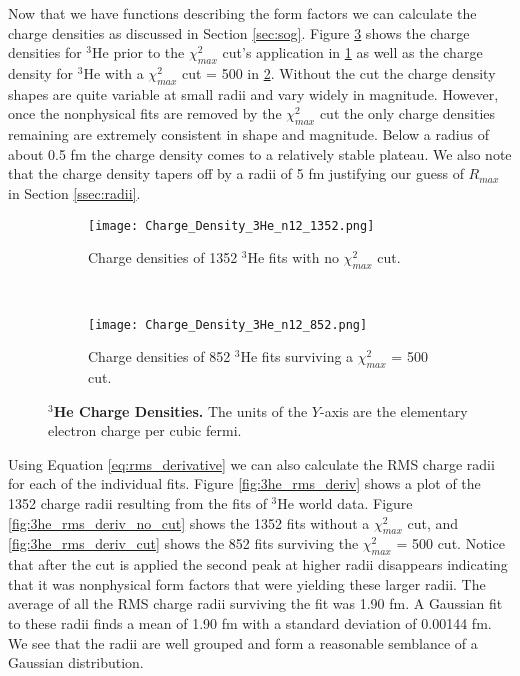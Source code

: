 Now that we have functions describing the form factors we can calculate the charge densities as discussed in Section \ref{sec:sog}. Figure \ref{fig:3he_charge_density} shows the charge densities for $^3$He prior to the $\chi^2_{max}$ cut's application in \ref{fig:3he_charge_density_no_cut} as well as the charge density for $^3$He with a $\chi^2_{max}$ cut = 500 in \ref{fig:3he_charge_density_cut}. Without the cut the charge density shapes are quite variable at small radii and vary widely in magnitude. However, once the nonphysical fits are removed by the $\chi^2_{max}$ cut the only charge densities remaining are extremely consistent in shape and magnitude. Below a radius of about 0.5 fm the charge density comes to a relatively stable plateau. We also note that the charge density tapers off by a radii of 5 fm justifying our guess of $R_{max}$ in Section \ref{ssec:radii}. %

\begin{figure}[!ht]
\begin{subfigure}{1.\textwidth}
  \centering
  \texttt{[image: Charge\_Density\_3He\_n12\_1352.png]}
  \caption{Charge densities of 1352 $^3$He fits with no $\chi^2_{max}$ cut.}
  \label{fig:3he_charge_density_no_cut}
\end{subfigure}\\
\begin{subfigure}{1.\textwidth}
  \centering
  \texttt{[image: Charge\_Density\_3He\_n12\_852.png]}
  \caption{Charge densities of 852 $^3$He fits surviving a $\chi^2_{max}$ = 500 cut.}
  \label{fig:3he_charge_density_cut}
\end{subfigure}
\caption[$^3$He Charge Densities]{{\bf{$^3$He Charge Densities.}} The units of the $Y$-axis are the elementary electron charge per cubic fermi.}
\label{fig:3he_charge_density}
\end{figure}

Using Equation \ref{eq:rms_derivative} we can also calculate the RMS charge radii for each of the individual fits. Figure \ref{fig:3he_rms_deriv} shows a plot of the 1352 charge radii resulting from the fits of $^3$He world data. Figure \ref{fig:3he_rms_deriv_no_cut} shows the 1352 fits without a $\chi^2_{max}$ cut, and \ref{fig:3he_rms_deriv_cut} shows the 852 fits surviving the $\chi^2_{max}$ = 500 cut. Notice that after the cut is applied the second peak at higher radii disappears indicating that it was nonphysical form factors that were yielding these larger radii. The average of all the RMS charge radii surviving the fit was 1.90 fm. A Gaussian fit to these radii finds a mean of 1.90 fm with a standard deviation of 0.00144 fm. We see that the radii are well grouped and form a reasonable semblance of a Gaussian distribution. %

